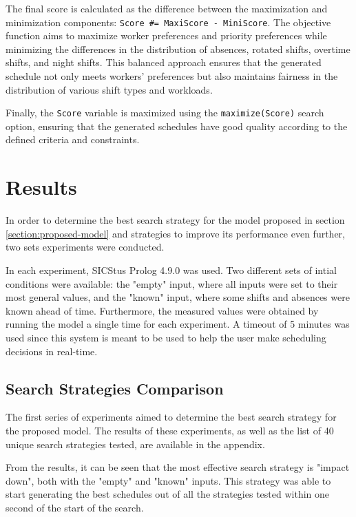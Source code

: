 \documentclass[conference]{IEEEtran}
\begin{document}
The final score is calculated as the difference between the maximization and minimization components: \texttt{Score \#= MaxiScore - MiniScore}. The objective function aims to maximize worker preferences and priority preferences while minimizing the differences in the distribution of absences, rotated shifts, overtime shifts, and night shifts. This balanced approach ensures that the generated schedule not only meets workers' preferences but also maintains fairness in the distribution of various shift types and workloads.

Finally, the \texttt{Score} variable is maximized using the  \texttt{maximize(Score)} search option, ensuring that the generated schedules have good quality according to the defined criteria and constraints.

\section{Results}
\label{section:results}

In order to determine the best search strategy for the model proposed in section \ref{section:proposed-model} and strategies to improve its performance even further, two sets experiments were conducted.

In each experiment, SICStus Prolog 4.9.0 was used. Two different sets of intial conditions were available: the "empty" input, where all inputs were set to their most general values, and the "known" input, where some shifts and absences were known ahead of time. Furthermore, the measured values were obtained by running the model a single time for each experiment. A timeout of 5 minutes was used since this system is meant to be used to help the user make scheduling decisions in real-time.

\subsection{Search Strategies Comparison}

The first series of experiments aimed to determine the best search strategy for the proposed model. The results of these experiments, as well as the list of 40 unique search strategies tested, are available in the appendix.

From the results, it can be seen that the most effective search strategy is "impact down", both with the "empty" and "known" inputs. This strategy was able to start generating the best schedules out of all the strategies tested within one second of the start of the search.
\end{document}
